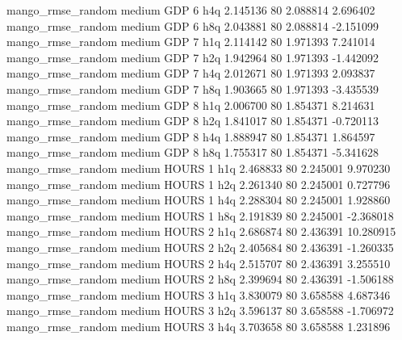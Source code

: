 mango_rmse_random     medium      GDP                 6                  h4q  2.145136 80       2.088814           2.696402
mango_rmse_random     medium      GDP                 6                  h8q  2.043881 80       2.088814          -2.151099
mango_rmse_random     medium      GDP                 7                  h1q  2.114142 80       1.971393           7.241014
mango_rmse_random     medium      GDP                 7                  h2q  1.942964 80       1.971393          -1.442092
mango_rmse_random     medium      GDP                 7                  h4q  2.012671 80       1.971393           2.093837
mango_rmse_random     medium      GDP                 7                  h8q  1.903665 80       1.971393          -3.435539
mango_rmse_random     medium      GDP                 8                  h1q  2.006700 80       1.854371           8.214631
mango_rmse_random     medium      GDP                 8                  h2q  1.841017 80       1.854371          -0.720113
mango_rmse_random     medium      GDP                 8                  h4q  1.888947 80       1.854371           1.864597
mango_rmse_random     medium      GDP                 8                  h8q  1.755317 80       1.854371          -5.341628
mango_rmse_random     medium    HOURS                 1                  h1q  2.468833 80       2.245001           9.970230
mango_rmse_random     medium    HOURS                 1                  h2q  2.261340 80       2.245001           0.727796
mango_rmse_random     medium    HOURS                 1                  h4q  2.288304 80       2.245001           1.928860
mango_rmse_random     medium    HOURS                 1                  h8q  2.191839 80       2.245001          -2.368018
mango_rmse_random     medium    HOURS                 2                  h1q  2.686874 80       2.436391          10.280915
mango_rmse_random     medium    HOURS                 2                  h2q  2.405684 80       2.436391          -1.260335
mango_rmse_random     medium    HOURS                 2                  h4q  2.515707 80       2.436391           3.255510
mango_rmse_random     medium    HOURS                 2                  h8q  2.399694 80       2.436391          -1.506188
mango_rmse_random     medium    HOURS                 3                  h1q  3.830079 80       3.658588           4.687346
mango_rmse_random     medium    HOURS                 3                  h2q  3.596137 80       3.658588          -1.706972
mango_rmse_random     medium    HOURS                 3                  h4q  3.703658 80       3.658588           1.231896
